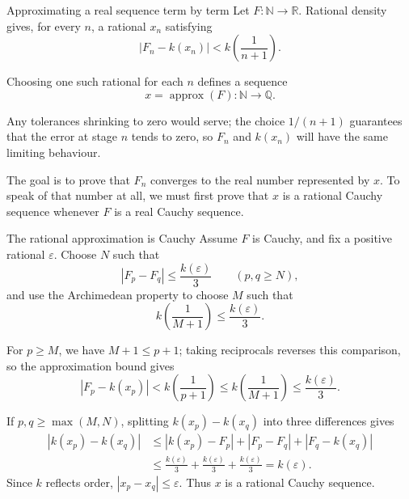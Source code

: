\documentclass[aspectratio=169,11pt]{beamer}
\newcommand{\N}{\mathbb N}
\newcommand{\Q}{\mathbb Q}
\newcommand{\R}{\mathbb R}
\begin{document}
\begin{frame}{Approximating a real sequence term by term}
  Let \(F\colon\N\to\R\).  Rational density gives, for every \(n\), a rational
  \(x_n\) satisfying
  \[
    \boxed{|F_n-k(x_n)|
      <k\!\left(\frac1{n+1}\right).}
  \]

  Choosing one such rational for each \(n\) defines a sequence
  \[
    x=\operatorname{approx}(F)\colon\N\longrightarrow\Q.
  \]

  Any tolerances shrinking to zero would serve; the choice \(1/(n+1)\)
  guarantees that the error at stage \(n\) tends to zero, so \(F_n\) and
  \(k(x_n)\) will have the same limiting behaviour.

  The goal is to prove that \(F_n\) converges to the real number
  represented by \(x\).  To speak of that number at all, we must first
  prove that \(x\) is a rational Cauchy sequence whenever \(F\) is a real
  Cauchy sequence.
\end{frame}

\begin{frame}{The rational approximation is Cauchy}
  \footnotesize
  Assume \(F\) is Cauchy, and fix a positive rational \(\varepsilon\).  Choose
  \(N\) such that
  \[
    |F_p-F_q|\le\frac{k(\varepsilon)}3
    \qquad(p,q\ge N),
  \]
  and use the Archimedean property to choose \(M\) such that
  \[
    k\!\left(\frac1{M+1}\right)
      \le\frac{k(\varepsilon)}3.
  \]

  For \(p\ge M\), we have \(M+1\le p+1\); taking reciprocals reverses this
  comparison, so the approximation bound gives
  \[
    |F_p-k(x_p)|
      <k\!\left(\frac1{p+1}\right)
      \le k\!\left(\frac1{M+1}\right)
      \le\frac{k(\varepsilon)}3.
  \]

  If \(p,q\ge\max(M,N)\), splitting \(k(x_p)-k(x_q)\) into three
  differences gives
  \begin{align*}
    |k(x_p)-k(x_q)|
      &\le |k(x_p)-F_p|+|F_p-F_q|+|F_q-k(x_q)|\\
      &\le\frac{k(\varepsilon)}3
        +\frac{k(\varepsilon)}3
        +\frac{k(\varepsilon)}3
       =k(\varepsilon).
  \end{align*}
  Since \(k\) reflects order, \(|x_p-x_q|\le\varepsilon\).  Thus \(x\) is a
  rational Cauchy sequence.
\end{frame}
\end{document}
